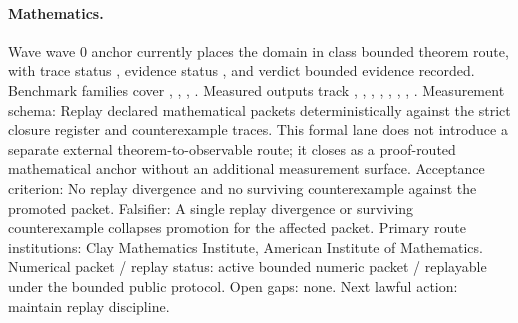 \paragraph{Mathematics.}
Wave wave 0 anchor currently places the domain in class bounded theorem route, with trace status , evidence status , and verdict bounded evidence recorded.
Benchmark families cover , \allowbreak {}, \allowbreak {}, \allowbreak {}.
Measured outputs track , \allowbreak {}, \allowbreak {}, \allowbreak {}, \allowbreak {}, \allowbreak {}, \allowbreak {}, \allowbreak {}.
Measurement schema: Replay declared mathematical packets deterministically against the strict closure register and counterexample traces.
This formal lane does not introduce a separate external theorem-to-observable route; it closes as a proof-routed mathematical anchor without an additional measurement surface.
Acceptance criterion: No replay divergence and no surviving counterexample against the promoted packet.
Falsifier: A single replay divergence or surviving counterexample collapses promotion for the affected packet.
Primary route institutions: Clay Mathematics Institute, \allowbreak American Institute of Mathematics.
Numerical packet / replay status: active bounded numeric packet / replayable under the bounded public protocol.
Open gaps: none.
Next lawful action: maintain replay discipline.

